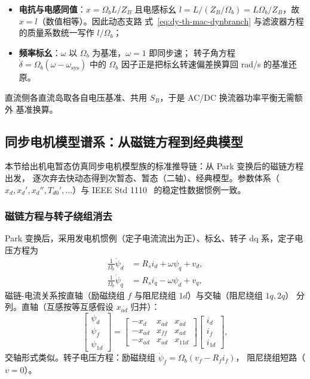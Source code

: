 \begin{remark}[标幺制的两条数值便利]\label{rem:dy-th-mac-pu-conv}
\begin{itemize}
  \item \textbf{电抗与电感同值}：$x=\Omega_b L/Z_B$ 且电感标幺
        $l=L/(Z_B/\Omega_b)=L\Omega_b/Z_B$，故 $x=l$（数值相等）。因此动态支路
        式~\eqref{eq:dy-th-mac-dynbranch} 与滤波器方程的质量系数统一写作
        $l/\Omega_b$；
  \item \textbf{频率标幺}：$\omega$ 以 $\Omega_b$ 为基准，$\omega=1$ 即同步速；
        转子角方程 $\dot\delta=\Omega_b(\omega-\omega_{\mathrm{sys}})$ 中的
        $\Omega_b$ 因子正是把标幺转速偏差换算回 rad/s 的基准还原。
\end{itemize}
直流侧各直流岛取各自电压基准、共用 $S_B$，于是 AC/DC 换流器功率平衡无需额外
基准换算。
\end{remark}

\subsection{同步电机模型谱系：从磁链方程到经典模型}\label{sec:dy-th-mac-machine}

本节给出机电暂态仿真同步电机模型族的标准推导链：从 Park 变换后的磁链方程出发，
逐次弃去快动态得到次暂态、暂态（二轴）、经典模型。参数体系（$x_d,x_d',x_d'',
T_{d0}',\dots$）与 IEEE Std 1110~\cite{dym:ieee1110} 的稳定性数据惯例一致。

\subsubsection{磁链方程与转子绕组消去}

Park 变换后，采用发电机惯例（定子电流流出为正）、标幺、转子 dq 系，定子电压方程为
\begin{align}
\frac{1}{\Omega_b}\dot\psi_d&=R_si_d+\omega\psi_q+v_d,\label{eq:dy-th-mac-stator-d}\\
\frac{1}{\Omega_b}\dot\psi_q&=R_si_q-\omega\psi_d+v_q,\label{eq:dy-th-mac-stator-q}
\end{align}
磁链-电流关系按直轴（励磁绕组 $f$ 与阻尼绕组 $1d$）与交轴（阻尼绕组 $1q,2q$）
分列。直轴（互感按等互感假设 $x_{ad}$ 归并）：
\begin{equation}
\begin{bmatrix}\psi_d\\\psi_f\\\psi_{1d}\end{bmatrix}
=
\begin{bmatrix}-x_d & x_{ad} & x_{ad}\\
-x_{ad} & x_{ff} & x_{ad}\\
-x_{ad} & x_{ad} & x_{11d}\end{bmatrix}
\begin{bmatrix}i_d\\i_f\\i_{1d}\end{bmatrix},
\label{eq:dy-th-mac-flux-d}
\end{equation}
交轴形式类似。转子电压方程：励磁绕组 $\dot\psi_f=\Omega_b(v_f-R_fi_f)$，
阻尼绕组短路（$v=0$）。


